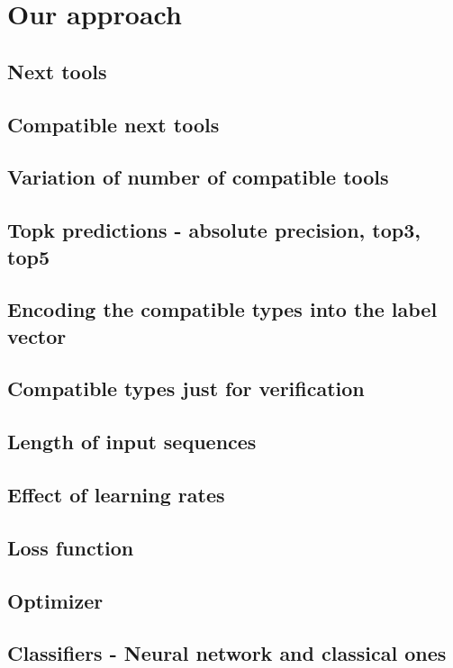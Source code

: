 \chapter{Our approach}\label{chap:approach_wf}

\section{Next tools}

\section{Compatible next tools}

\section{Variation of number of compatible tools}

\section{Topk predictions - absolute precision, top3, top5}

\section{Encoding the compatible types into the label vector}

\section{Compatible types just for verification}

\section{Length of input sequences}

\section{Effect of learning rates}

\section{Loss function}

\section{Optimizer}

\section{Classifiers - Neural network and classical ones}

\section{}

